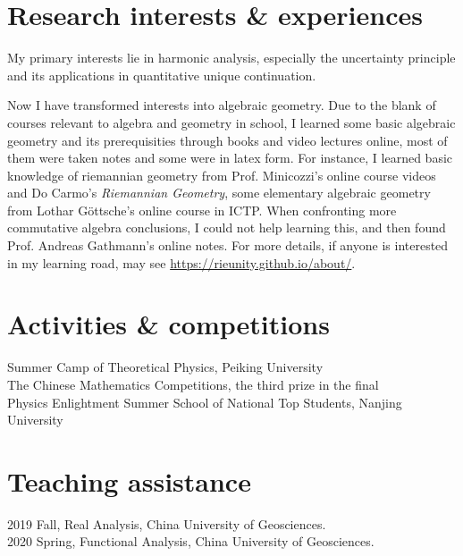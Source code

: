 \documentclass[11pt]{article} %
\begin{document}

\section*{Research interests \& experiences}
My primary interests lie in harmonic analysis, especially the uncertainty principle and its applications in quantitative unique continuation. 

Now I have transformed interests into algebraic geometry. Due to the blank of courses relevant to algebra and geometry in school, I learned some basic algebraic geometry and its prerequisities through books and video lectures online, most of them were taken notes and some were in latex form. For instance, I learned basic knowledge of riemannian geometry from Prof. Minicozzi's online course videos and Do Carmo's \textit{Riemannian Geometry}, some elementary algebraic geometry from Lothar G\"{o}ttsche's online course in ICTP. When confronting more commutative algebra conclusions, I could not help learning this, and then found Prof. Andreas Gathmann's online notes. For more details, if anyone is interested in my learning road, may see \url{https://rieunity.github.io/about/}.

\section*{Activities \& competitions}
 Summer Camp of Theoretical Physics, Peiking University\\
 The Chinese Mathematics Competitions, the third prize  in the final\\
 Physics Enlightment Summer School of National Top Students, Nanjing University


\section*{Teaching assistance}
2019 Fall, Real Analysis, China University of Geosciences. \\
2020 Spring, Functional Analysis, China University of Geosciences.
\end{document}
